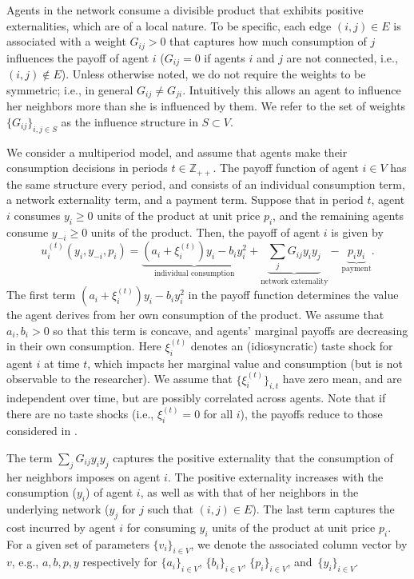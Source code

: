 \documentclass[opre,nonblindrev]{informs3} %
\begin{document}
Agents in the network consume a
divisible product that exhibits positive externalities,
which are of a local nature.
To be specific,  each edge $(i,j)\in E$ is associated with a weight $G_{ij}>0$ that captures
how much  consumption of $j$ influences the payoff of agent $i$ ($G_{ij}=0$ if agents $i$ and $j$ are not connected, i.e., $(i,j)\notin E$).
Unless  otherwise noted, we do not require the weights to be symmetric; i.e., in general $G_{ij}\neq G_{ji}$.
Intuitively this allows an agent to influence her neighbors more than she is influenced by them.
We refer to the set of weights $\{G_{ij}\}_{i,j \in S}$ as the influence structure in $S\subset V$.


We consider a multiperiod model, and assume that
agents make their consumption decisions
 in periods $t\in \mathbb{Z}_{++}$.
The payoff function of agent $i\in V$
has the same structure every period, and
  consists of an individual consumption  term, a network externality term, and a payment term.
Suppose  that in period $t$,
agent $i$ consumes  $y_i\geq 0$ units of the product at  unit price  $p_i$, and the remaining agents consume $y_{-i}\geq 0$ units of the product. Then, the payoff of agent $i$ is given by
\begin{equation}\label{eq:basicUtil}
u_i^{(t)}(y_i,y_{-i}, p_i)=
\underbrace{(a_i+\xi_i^{(t)})    y_i-b_i y_i^2}_{\mbox{individual consumption}} + \underbrace{\sum_{j} G_{ij} y_i y_j}_{\mbox{network externality}} - \underbrace{p_i y_i}_{\mbox{{payment}}}.
\end{equation}
The first term $(a_i+\xi_i^{(t)}) y_i-b_i y_i^2$ in the payoff function
determines the value the agent derives from her own consumption of the product. We assume that $a_i,b_i>0$ so that this term is concave, and agents' marginal payoffs are decreasing in their own consumption.
Here $\xi_i^{(t)}$ denotes an {(idiosyncratic)} taste shock for agent $i$ at time $t$, which
impacts her marginal value and consumption (but is not observable to the researcher). We assume that $\{\xi_i^{(t)}\}_{i,t}$ have zero mean, and are independent over time,  but are possibly correlated across agents.
Note that if there are no taste shocks (i.e.,  $\xi_i^{(t)}=0$ for all $i$), the payoffs reduce to those considered in \citet{candogan2012optimal}.

The  term $\sum_{j} G_{ij} y_i y_j$ captures the positive externality that the consumption of her neighbors imposes on agent $i$. The positive externality increases with the consumption ($y_i$) of agent $i$, as well as with that of her  neighbors in the underlying network ($y_j$ for $j$ such that $(i,j)\in E$).
The last term captures the cost incurred by agent $i$ for consuming $y_i$ units of the product at unit price $p_i$.
For a given set of parameters $\{v_i\}_{i\in V}$, we denote the associated column vector by ${v}$, e.g., ${a,b,p,y}$ respectively for $\{a_i\}_{i\in V}$, $\{b_i\}_{i\in V}$, $\{p_i\}_{i\in V}$, and~$\{y_i\}_{i\in V}$.
\end{document}
